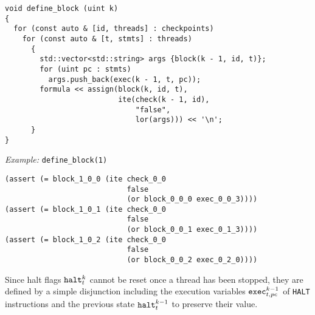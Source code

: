 \begin{lstlisting}[style=c++]
void define_block (uint k)
{
  for (const auto & [id, threads] : checkpoints)
    for (const auto & [t, stmts] : threads)
      {
        std::vector<std::string> args {block(k - 1, id, t)};
        for (uint pc : stmts)
          args.push_back(exec(k - 1, t, pc));
        formula << assign(block(k, id, t),
                          ite(check(k - 1, id),
                              "false",
                              lor(args))) << '\n';
      }
}
\end{lstlisting}

\noindent
\emph{Example:} \lstinline[style=c++]{define_block(1)}

\begin{lstlisting}[language=SMTLib]
(assert (= block_1_0_0 (ite check_0_0
                            false
                            (or block_0_0_0 exec_0_0_3))))
(assert (= block_1_0_1 (ite check_0_0
                            false
                            (or block_0_0_1 exec_0_1_3))))
(assert (= block_1_0_2 (ite check_0_0
                            false
                            (or block_0_0_2 exec_0_2_0))))
\end{lstlisting}



\newpage

\noindent
Since halt flags $\texttt{halt}^k_t$ cannot be reset once a thread has been stopped, they are defined by a simple disjunction including the execution variables $\texttt{exec}^{k - 1}_{t, pc}$ of \lstinline[language={[concubine]Assembler}]{HALT} instructions and the previous state $\texttt{halt}^{k - 1}_t$ to preserve their value.

